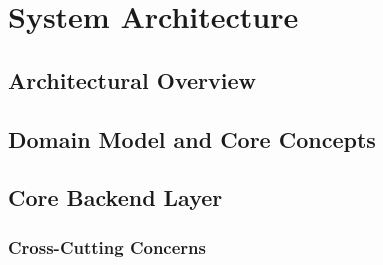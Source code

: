 \documentclass[a4paper,twoside]{sapthesis}
\begin{document}

\chapter{System Architecture}
\label{ch:architecture}


\section{Architectural Overview}
\label{sec:arch-overview}

\section{Domain Model and Core Concepts}
\label{sec:domain-model}

\section{Core Backend Layer}
\label{sec:core-backend}

\subsection{Cross-Cutting Concerns}
\end{document}
